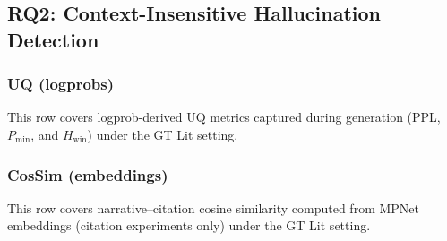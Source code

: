 \subsection{RQ2: Context-Insensitive Hallucination Detection}
\label{sec:rq2_experiments}

\subsubsection{UQ (logprobs)}\label{sec:rq2_uq_logprobs}
\noindent This row covers logprob-derived UQ metrics captured during generation (PPL, $P_{\min}$, and $H_{\text{win}}$) under the GT Lit setting.

\subsubsection{CosSim (embeddings)}\label{sec:rq2_cossim_embeddings}
\noindent This row covers narrative--citation cosine similarity computed from MPNet embeddings (citation experiments only) under the GT Lit setting.

